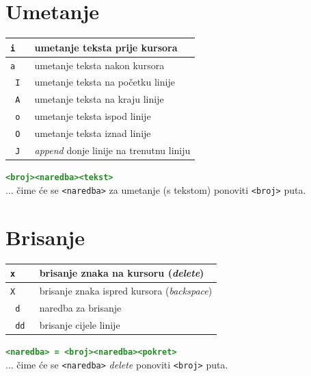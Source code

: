 \documentclass[10pt]{article}
\begin{document}
    \section*{\color{ForestGreen} Umetanje}
    \begin{tabular}{|>{\tt}p{9.00cm}|>{}p{15.50cm}|}
        \hline
        i               & umetanje teksta prije kursora                   \\ \hline
        a               & umetanje teksta nakon kursora                   \\ \hline \hline
        I               & umetanje teksta na početku linije               \\ \hline 
        A               & umetanje teksta na kraju linije                 \\ \hline \hline
        o               & umetanje teksta ispod linije                    \\ \hline
        O               & umetanje teksta iznad linije                    \\ \hline \hline
        J               & \textit{append} donje linije na trenutnu liniju \\ \hline
    \end{tabular}
    \begin{center}
        \large
        \textcolor{ForestGreen}{\texttt{\textbf{<broj><naredba><tekst>}}}
        \\
        ... čime će se \texttt{<naredba>} za umetanje (s tekstom) ponoviti \texttt{<broj>} puta. 
    \end{center}

    \section*{\color{ForestGreen} Brisanje}
    \begin{tabular}{|>{\tt}p{9.00cm}|>{}p{15.50cm}|}
        \hline
        x       & brisanje znaka na kursoru (\textit{delete})               \\ \hline
        X       & brisanje znaka ispred kursora (\textit{backspace})        \\ \hline \hline
        d       & naredba za brisanje                                       \\ \hline
        dd      & brisanje cijele linije                                    \\ \hline
    \end{tabular}
    \begin{center}
        \large
        \textcolor{ForestGreen}{\texttt{\textbf{<naredba> = <broj><naredba><pokret>}}}
        \\
        ... čime će se \texttt{<naredba>} \textit{delete} ponoviti \texttt{<broj>} puta. 
    \end{center}
    \newpage
\end{document}
